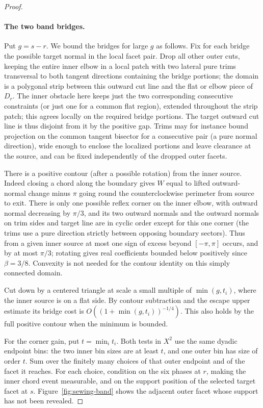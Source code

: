 \begin{proof}
\paragraph{The two band bridges.}
Put \(g=s-r\). We bound the bridges for large \(g\) as follows. Fix for each bridge the possible target normal in the local facet pair. Drop all other outer cuts, keeping the entire inner elbow in a local patch with two lateral pure trims transversal to both tangent directions containing the bridge portions; the domain is a polygonal strip between this outward cut line and the flat or elbow piece of \(D_r\). The inner obstacle here keeps just the two corresponding consecutive constraints (or just one for a common flat region), extended throughout the strip patch; this agrees locally on the required bridge portions. The target outward cut line is thus disjoint from it by the positive gap. Trims may for instance bound projection on the common tangent bisector for a consecutive pair (a pure normal direction), wide enough to enclose the localized portions and leave clearance at the source, and can be fixed independently of the dropped outer facets. 

There is a positive contour (after a possible rotation) from the inner source. Indeed closing a chord along the boundary gives \(W\) equal to lifted outward-normal change minus \(\pi\) going round the counterclockwise perimeter from source to exit. There is only one possible reflex corner on the inner elbow, with outward normal decreasing by \(\pi/3\), and its two outward normals and the outward normals on trim sides and target line are in cyclic order except for this one corner (the trims use a pure direction strictly between opposing boundary sectors). Thus from a given inner source at most one sign of excess beyond \([-\pi,\pi]\) occurs, and by at most \(\pi/3\); rotating gives real coefficients bounded below positively since \(\beta=3/8\). Convexity is not needed for the contour identity on this simply connected domain. 

Cut down by a centered triangle at scale a small multiple of \(\min(g,t_i)\), where the inner source is on a flat side. By contour subtraction and the escape upper estimate its bridge cost is \(O((1+\min(g,t_i))^{-1/4})\). This also holds by the full positive contour when the minimum is bounded. 

For the corner gain, put \(t=\min_i t_i\). Both tests in \(X^2\) use the same dyadic endpoint bins: the two inner bin sizes are at least \(t\), and one outer bin has size of order \(t\). Sum over the finitely many choices of that outer endpoint and of the facet it reaches. For each choice, condition on the six phases at \(r\), making the inner chord event measurable, and on the support position of the selected target facet at \(s\). Figure~\ref{fig:sewing-band} shows the adjacent outer facet whose support has not been revealed.



\end{proof}
